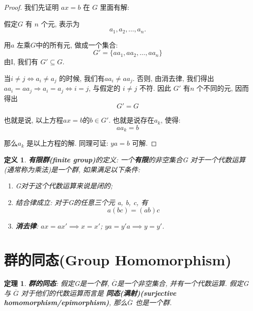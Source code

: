 \documentclass[utf8]{ctexbook}
\newtheorem{theorem}{定理}[section]
\newtheorem{definition}{定义}[section]
\begin{document}
\begin{proof}
我们先证明 $ax = b$ 在 $G$ 里面有解:

假定$G$ 有 $n$ 个元, 表示为
\begin{equation}
a_1, a_2, \ldots, a_n .
\end{equation}

用$a$ 左乘$G$中的所有元, 做成一个集合:
\begin{equation}
G' = \{ a a_1, a a_2, \ldots, a a_n \}
\end{equation}
由I, 我们有 $G' \subseteq G$.

当$i \neq j \iff a_i \neq a_j$ 的时候, 我们有$a a_i \neq a a_j$. 否则, 由消去律, 我们得出$a a_i = a a_j \Rightarrow a_i = a_j \iff i = j$, 与假定的 $i \neq j $ 不符. 因此 $G'$ 有$n$ 个不同的元, 因而得出
\begin{equation}
G' = G
\end{equation}

也就是说, 以上方程$ax=b$的$b \in G'$. 也就是说存在$a_k$, 使得:
\begin{equation}
a a_k = b
\end{equation}

那么$a_k$ 是以上方程的解.  同理可证: $ya = b$ 可解. 
\end{proof}

\begin{definition}\label{def_finite_group}
\textbf{有限群(finite group)}的定义: 一个\textbf{有限}的非空集合G 对于一个代数运算(通常称为乘法)是一个群, 如果满足以下条件:
\begin{enumerate}
\item[I.]{G对于这个代数运算来说是闭的;}
\item[II.]{结合律成立: 对于G的任意三个元 a, b, c, 有
	\begin{equation}
		a(bc) = (ab) c 	
	\end{equation}
}
\item[III']{\textbf{消去律}: $ax = a x' \implies x = x'$; $ya = y' a \implies y = y'$.}
\end{enumerate}
\end{definition}


\section{群的同态(Group Homomorphism)}

\begin{theorem}\label{thm_group_homomorphism}
\textbf{群的同态}: 假定G是一个群, $\overline{G}$是一个非空集合, 并有一个代数运算. 假定G与 $\overline{G}$ 对于他们的代数运算而言是 \textbf{同态(满射)(surjective homomorphism/epimorphism)}, 那么$\overline{G}$ 也是一个群.
\end{theorem}
\end{document}
